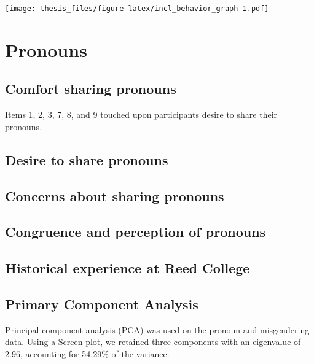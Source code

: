 \documentclass[12pt,twoside]{reedthesis}
\begin{document}
\texttt{[image: thesis\_files/figure-latex/incl\_behavior\_graph-1.pdf]}

\hypertarget{pronouns-1}{%
\section{Pronouns}\label{pronouns-1}}

\hypertarget{comfort-sharing-pronouns}{%
\subsection{Comfort sharing pronouns}\label{comfort-sharing-pronouns}}

Items 1, 2, 3, 7, 8, and 9 touched upon participants desire to share their pronouns.

\hypertarget{desire-to-share-pronouns}{%
\subsection{Desire to share pronouns}\label{desire-to-share-pronouns}}

\hypertarget{concerns-about-sharing-pronouns}{%
\subsection{Concerns about sharing pronouns}\label{concerns-about-sharing-pronouns}}

\hypertarget{congruence-and-perception-of-pronouns}{%
\subsection{Congruence and perception of pronouns}\label{congruence-and-perception-of-pronouns}}

\hypertarget{historical-experience-at-reed-college}{%
\subsection{Historical experience at Reed College}\label{historical-experience-at-reed-college}}

\hypertarget{primary-component-analysis}{%
\subsection{Primary Component Analysis}\label{primary-component-analysis}}

Principal component analysis (PCA) was used on the pronoun and misgendering data. Using a Screen plot, we retained three components with an eigenvalue of 2.96, accounting for 54.29\% of the variance.
\end{document}
